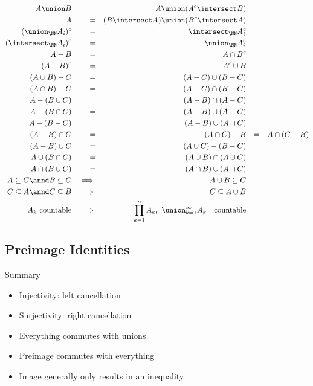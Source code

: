 \begin{align*}
A \union B                          && = && A \union (A^c \intersect B) \\
A                                   && = && (B\intersect A) \union (B^c \intersect A) \\
(\union_\NN A_i)^c                  && = && \intersect_\NN A_i^c \\
(\intersect_\NN A_i)^c              && = && \union_\NN A_i^c \\
A - B                               && = && A \cap B^c \\
(A-B)^c                             && = && A^c \cup B \\
(A\cup B) - C                       && = && (A-C) \cup (B-C) \\
(A\cap B) - C                       && = && (A-C) \cap (B-C) \\
A - (B \cup C)                      && = && (A - B) \cap (A - C) \\
A - (B \cap C)                      && = && (A-B) \cup (A-C) \\
A - (B - C)                         && = && (A-B) \cup (A \cap C) \\
(A-B) \cap C                        && = && (A \cap C) - B && = && A \cap (C-B) \\
(A-B) \cup C                        && = && (A \cup C) - (B-C) \\
A\cup(B\cap C)                      && = && (A\cup B) \cap (A\cup C) \\
A\cap(B\cup C)                      && = && (A\cap B) \cup (A \cap C) \\
A \subseteq C \annd B \subseteq C   &&\implies && A \cup B \subseteq C \\
C \subseteq A \annd C \subseteq B   &&\implies && C \subseteq A \cup B \\
A_k ~\text{countable}               &&\implies && \prod_{k=1}^n A_k, ~ \union_{k=1}^\infty A_k \quad\text{countable}
\end{align*}

\hypertarget{preimage-identities}{%
\subsection{Preimage Identities}\label{preimage-identities}}

Summary

\begin{itemize}
\tightlist
\item
  Injectivity: left cancellation
\item
  Surjectivity: right cancellation
\item
  Everything commutes with unions
\item
  Preimage commutes with everything
\item
  Image generally only results in an inequality
\end{itemize}

